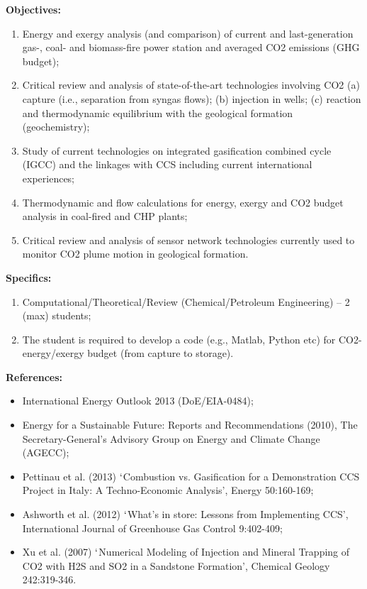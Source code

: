 \documentclass[12pts,a4paper,amsmath,amssymb,floatfix]{article}%
\begin{document}
\begin{enumerate}[label=\bfseries Project \arabic*:]
\noindent
{\bf Objectives:}
\begin{enumerate}
\item Energy and exergy analysis (and comparison) of current and last-generation gas-, coal- and biomass-fire power station and averaged CO2 emissions (GHG budget);
\item Critical review and analysis of state-of-the-art technologies involving CO2 (a) capture (i.e., separation from syngas flows); (b) injection in wells; (c) reaction and thermodynamic equilibrium with the geological formation (geochemistry);
\item Study of current technologies on integrated gasification combined cycle (IGCC) and the linkages with CCS including current international experiences;
\item Thermodynamic and flow calculations for energy, exergy and CO2 budget analysis in coal-fired and CHP plants;
\item Critical review and analysis of sensor network technologies currently used to monitor CO2 plume motion in geological formation.
\end{enumerate}

\noindent
{\bf Specifics:} 
\begin{enumerate}
\item Computational/Theoretical/Review (Chemical/Petroleum Engineering) -- 2 (max) students;
\item The student is required to develop a code (e.g., Matlab, Python etc) for CO2-energy/exergy budget (from capture to storage).
\end{enumerate}

\noindent
{\bf References:}
\begin{itemize}
\item International Energy Outlook 2013 (DoE/EIA-0484);
\item Energy for a Sustainable Future: Reports and Recommendations (2010), The Secretary-General’s Advisory Group on Energy and Climate Change (AGECC);
\item Pettinau et al. (2013) $\lq$Combustion vs. Gasification for a Demonstration CCS Project in Italy: A Techno-Economic Analysis’, Energy 50:160-169;
\item Ashworth et al. (2012) $\lq$What’s in store: Lessons from Implementing CCS’, International Journal of Greenhouse Gas Control 9:402-409;
\item Xu et al. (2007) $\lq$Numerical Modeling of Injection and Mineral Trapping of CO2 with H2S and SO2 in a Sandstone Formation’, Chemical Geology 242:319-346.
\end{itemize}


\end{enumerate}
\end{document}
